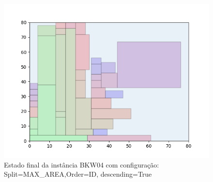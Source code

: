 \begin{figure}[H]
    \centering
    \caption[]{Estado final da instância BKW04 com configuração: Split=MAX_AREA,Order=ID, descending=True}
    \label{fig:bkw04-max_area-id-true}
    \includegraphics[scale=0.5]{output/figures/bkw/bkw04/max_area/id/true/00}
\end{figure}